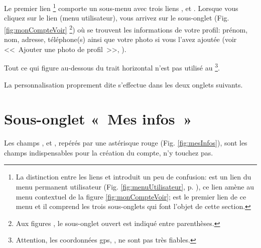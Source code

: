 Le premier lien 
\footnote{La distinction entre les liens  et  introduit un peu de confusion:  est un lien du menu permanent utilisateur (Fig. \ref{fig:menuUtilisateur}, p. \pageref{fig:menuUtilisateur}), ce lien amène au menu contextuel de la figure \vref{fig:monCompteVoir};  est le premier lien de ce menu et il comprend les trois sous-onglets qui font l'objet de cette section.}
comporte un sous-menu avec trois liens ,  et . Lorsque vous cliquez sur le lien  (menu utilisateur), vous arrivez sur le sous-onglet  (Fig. \ref{fig:monCompteVoir}%
\footnote{Aux figures , le sous-onglet ouvert est indiqué entre parenthèses.})
où se trouvent les informations de votre profil: prénom, nom, adresse, téléphone(s) ainsi que votre photo si vous l'avez ajoutée (voir <<~Ajouter une photo de profil~>>, ).

Tout ce qui figure au-dessous du trait horizontal n’est pas utilisé au \CdS
\footnote{Attention, les coordonnées gps, , ne sont pas très fiables.}.

La personnalisation proprement dite s’effectue dans les deux onglets suivants.

\section{Sous-onglet «~Mes infos~»}
\label{page:completerInfosPerso}

Les champs ,  et , repérés par une astérisque rouge (Fig. \vref{fig:mesInfos}), sont les champs indispensables pour la création du compte, n’y touchez pas.



